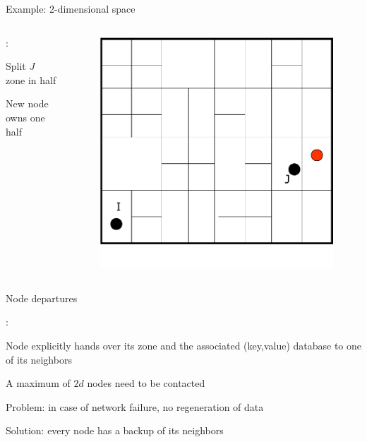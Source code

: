 \begin{frame}{Example: 2-dimensional space}

\begin{columns}
\begin{column}{0.5\textwidth}
:\\
\BE
\item Split $J$ zone in half
\item New node owns one half
\EE
\end{column}
\begin{column}{0.5\textwidth}
\begin{figure}
	\includegraphics[width=1.0\textwidth]{can-join2}
\end{figure}
\end{column}
\end{columns}

\end{frame}

\begin{frame}{Node departures}

:
\BIL
\item Node explicitly hands over its zone and the associated (key,value) database to one of its neighbors
\item A maximum of $2d$ nodes need to be contacted
\item Problem: in case of network failure, no regeneration of data
\item Solution: every node has a backup of its neighbors 
\EIL
	
\end{frame}


